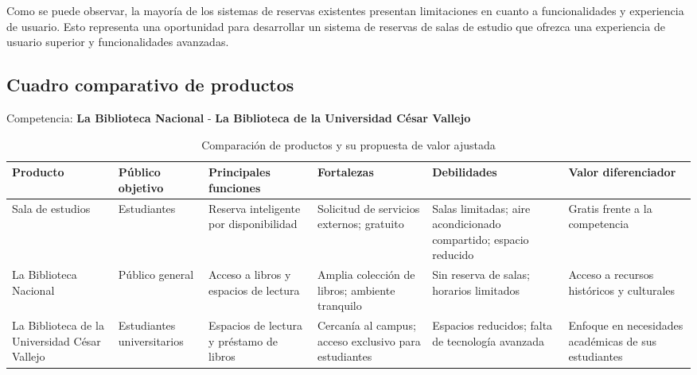 \documentclass{article}
\begin{document}
      Como se puede observar, la mayoría de los sistemas de reservas existentes presentan limitaciones en cuanto a funcionalidades y experiencia de usuario. Esto representa una oportunidad para desarrollar un sistema de reservas de salas de estudio que ofrezca una experiencia de usuario superior y funcionalidades avanzadas.

      \subsection{Cuadro comparativo de productos}

      Competencia: \textbf{La Biblioteca Nacional} - \textbf{La Biblioteca de la Universidad César Vallejo}

      \begin{table}[ht]
        \centering
        \scriptsize
        \begin{tabularx}{\textwidth}{|>{\raggedright\arraybackslash}X|>{\raggedright\arraybackslash}X|>{\raggedright\arraybackslash}X|>{\raggedright\arraybackslash}X|>{\raggedright\arraybackslash}X|>{\raggedright\arraybackslash}X|}
        \hline
        \textbf{Producto} & \textbf{Público objetivo} & \textbf{Principales funciones} & \textbf{Fortalezas} & \textbf{Debilidades} & \textbf{Valor diferenciador} \\
        \hline
        Sala de estudios & Estudiantes  & Reserva inteligente por disponibilidad  & Solicitud de servicios externos; gratuito  & Salas limitadas; aire acondicionado compartido; espacio reducido  & Gratis frente a la competencia  \\
        \hline
        La Biblioteca Nacional & Público general  & Acceso a libros y espacios de lectura  & Amplia colección de libros; ambiente tranquilo  & Sin reserva de salas; horarios limitados  & Acceso a recursos históricos y culturales  \\
        \hline
        La Biblioteca de la Universidad César Vallejo & Estudiantes universitarios  & Espacios de lectura y préstamo de libros  & Cercanía al campus; acceso exclusivo para estudiantes  & Espacios reducidos; falta de tecnología avanzada  & Enfoque en necesidades académicas de sus estudiantes  \\
        \hline
        \end{tabularx}
        \caption{Comparación de productos y su propuesta de valor ajustada}
        \label{tab:comparacion-productos}
        \end{table}
\end{document}
